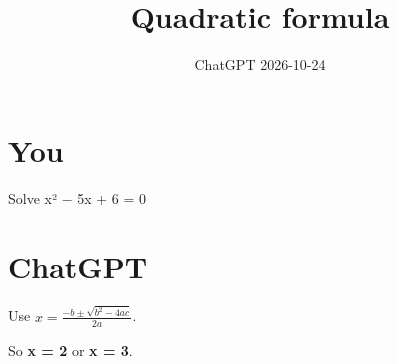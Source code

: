 \documentclass[11pt,a4paper]{article}
\title{Quadratic formula}
\date{ChatGPT \textperiodcentered{} 2026-10-24}
\begin{document}
\maketitle

\section*{You}

Solve x² − 5x + 6 = 0


\section*{ChatGPT}

Use $x=\frac{-b\pm\sqrt{b^2-4ac}}{2a}$.

So \textbf{x = 2} or \textbf{x = 3}.
\end{document}
